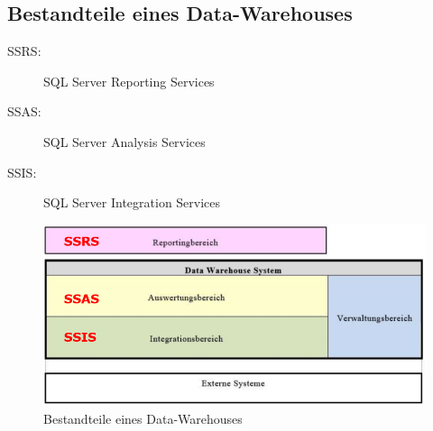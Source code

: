 \documentclass[a4paper, 11pt]{article}
\begin{document}

\subsection{Bestandteile eines Data-Warehouses}

\begin{description}
	\item [SSRS: ] SQL Server Reporting Services
	\item [SSAS: ] SQL Server Analysis Services
	\item [SSIS: ] SQL Server Integration Services
\end{description}

\begin{figure}[htb]
	\centering
	\includegraphics[keepaspectratio=true,height=18\baselineskip]{bestandteiledatawarehouse.png}
	\caption{Bestandteile eines Data-Warehouses}
	\label{fig:bstdw}
\end{figure}
\end{document}
